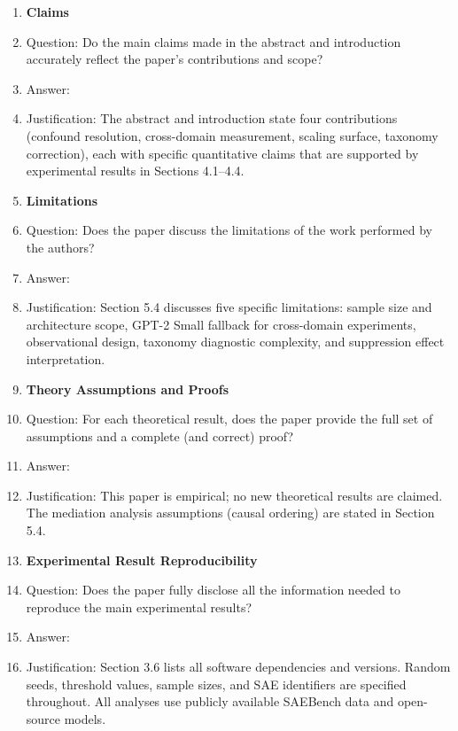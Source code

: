 \documentclass{article}
\begin{document}
\begin{enumerate}

\item {\bf Claims}
    \item[] Question: Do the main claims made in the abstract and introduction accurately reflect the paper's contributions and scope?
    \item[] Answer: \answerYes{}
    \item[] Justification: The abstract and introduction state four contributions (confound resolution, cross-domain measurement, scaling surface, taxonomy correction), each with specific quantitative claims that are supported by experimental results in Sections 4.1--4.4.

\item {\bf Limitations}
    \item[] Question: Does the paper discuss the limitations of the work performed by the authors?
    \item[] Answer: \answerYes{}
    \item[] Justification: Section 5.4 discusses five specific limitations: sample size and architecture scope, GPT-2 Small fallback for cross-domain experiments, observational design, taxonomy diagnostic complexity, and suppression effect interpretation.

\item {\bf Theory Assumptions and Proofs}
    \item[] Question: For each theoretical result, does the paper provide the full set of assumptions and a complete (and correct) proof?
    \item[] Answer: \answerNA{}
    \item[] Justification: This paper is empirical; no new theoretical results are claimed. The mediation analysis assumptions (causal ordering) are stated in Section 5.4.

\item {\bf Experimental Result Reproducibility}
    \item[] Question: Does the paper fully disclose all the information needed to reproduce the main experimental results?
    \item[] Answer: \answerYes{}
    \item[] Justification: Section 3.6 lists all software dependencies and versions. Random seeds, threshold values, sample sizes, and SAE identifiers are specified throughout. All analyses use publicly available SAEBench data and open-source models.


\end{enumerate}
\end{document}
